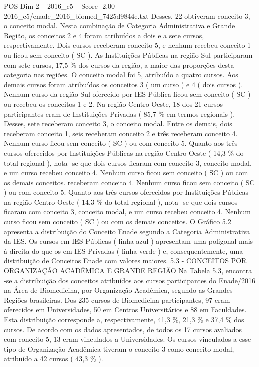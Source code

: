 \begin{textsample}{POS Dim 2 – 2016\_c5 – Score -2.00 – 2016\_c5/enade\_2016\_biomed\_7425d9844e.txt}
Desses, 22 obtiveram conceito 3, o conceito modal.
Nesta combinação de Categoria Administrativa e Grande Região, os conceitos 2 e 4 foram atribuídos a dois e a sete cursos, respectivamente.
Dois cursos receberam conceito 5, e nenhum recebeu conceito 1 ou ficou sem conceito ( SC ).
As Instituições Públicas na região Sul participaram com sete cursos, 17,5 \% dos cursos da região, a maior das proporções desta categoria nas regiões.
O conceito modal foi 5, atribuído a quatro cursos.
Aos demais cursos foram atribuídos os conceitos 3 ( um curso ) e 4 ( dois cursos ).
Nenhum curso da região Sul oferecido por IES Pública ficou sem conceito ( SC ) ou recebeu os conceitos 1 e 2.
Na região Centro-Oeste, 18 dos 21 cursos participantes eram de Instituições Privadas ( 85,7 \% em termos regionais ).
Desses, sete receberam conceito 3, o conceito modal.
Entre os demais, dois receberam conceito 1, seis receberam conceito 2 e três receberam conceito 4.
Nenhum curso ficou sem conceito ( SC ) ou com conceito 5.
Quanto aos três cursos oferecidos por Instituições Públicas na região Centro-Oeste ( 14,3 \% do total regional ), nota -se que dois cursos ficaram com conceito 3, conceito modal, e um curso recebeu conceito 4.
Nenhum curso ficou sem conceito ( SC ) ou com os demais conceitos. receberam conceito 4.
Nenhum curso ficou sem conceito ( SC ) ou com conceito 5.
Quanto aos três cursos oferecidos por Instituições Públicas na região Centro-Oeste ( 14,3 \% do total regional ), nota -se que dois cursos ficaram com conceito 3, conceito modal, e um curso recebeu conceito 4.
Nenhum curso ficou sem conceito ( SC ) ou com os demais conceitos.
O Gráfico 5.2 apresenta a distribuição do Conceito Enade segundo a Categoria Administrativa da IES.
Os cursos em IES Públicas ( linha azul ) apresentam uma poligonal mais à direita do que os em IES Privadas ( linha verde ) e, consequentemente, uma distribuição de Conceitos Enade com valores maiores. 5.3 - CONCEITOS POR ORGANIZAÇÃO ACADÊMICA E GRANDE REGIÃO Na Tabela 5.3, encontra -se a distribuição dos conceitos atribuídos aos cursos participantes do Enade/2016 na Área de Biomedicina, por Organização Acadêmica, segundo as Grandes Regiões brasileiras.
Dos 235 cursos de Biomedicina participantes, 97 eram oferecidos em Universidades, 50 em Centros Universitários e 88 em Faculdades.
Esta distribuição corresponde a, respectivamente, 41,3 \%, 21,3 \% e 37,4 \% dos cursos.
De acordo com os dados apresentados, de todos os 17 cursos avaliados com conceito 5, 13 eram vinculados a Universidades.
Os cursos vinculados a esse tipo de Organização Acadêmica tiveram o conceito 3 como conceito modal, atribuído a 42 cursos ( 43,3 \% ).

\end{textsample}
